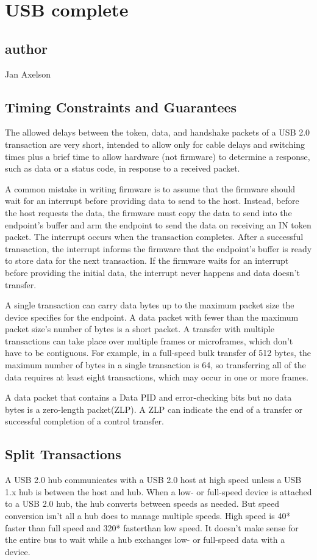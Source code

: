 
\chapter{USB complete}
\section{author}
Jan Axelson
\section{Timing Constraints and Guarantees}

The allowed delays between the token, data, and handshake packets of a USB
2.0 transaction are very short, intended to allow only for cable delays and
switching times plus a brief time to allow hardware (not firmware) to determine
a response, such as data or a status code, in response to a received packet.

A common mistake in writing firmware is to assume that the firmware should
wait for an interrupt before providing data to send to the host. Instead, before
the host requests the data, the firmware must copy the data to send into the
endpoint’s buffer and arm the endpoint to send the data on receiving an IN
token packet. The interrupt occurs when the transaction completes. After a successful transaction, the interrupt informs the firmware that the endpoint’s
buffer is ready to store data for the next transaction. If the firmware waits for an
interrupt before providing the initial data, the interrupt never happens and data
doesn’t transfer.

A single transaction can carry data bytes up to the maximum packet size the
device specifies for the endpoint. A data packet with fewer than the maximum
packet size’s number of bytes is a short packet. A transfer with multiple transactions can take place over multiple frames or microframes, which don’t have to
be contiguous. For example, in a full-speed bulk transfer of 512 bytes, the maximum number of bytes in a single transaction is 64, so transferring all of the
data requires at least eight transactions, which may occur in one or more
frames.

A data packet that contains a Data PID and error-checking bits but no data
bytes is a zero-length packet(ZLP). A ZLP can indicate the end of a transfer or
successful completion of a control transfer.
\section{Split Transactions}
A USB 2.0 hub communicates with a USB 2.0 host at high speed unless a USB
1.x hub is between the host and hub. When a low- or full-speed device is
attached to a USB 2.0 hub, the hub converts between speeds as needed. But
speed conversion isn’t all a hub does to manage multiple speeds. High speed is
40* faster than full speed and 320* fasterthan low speed. It doesn’t make sense
for the entire bus to wait while a hub exchanges low- or full-speed data with a
device.

